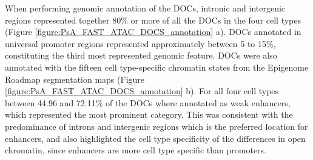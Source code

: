   
When performing genomic annotation of the DOCs, intronic and intergenic regions represented together 80\% or more of all the DOCs in the four cell types (Figure \ref{figure:PsA_FAST_ATAC_DOCS_annotation} a). DOCs annotated in universal promoter regions represented approximately between 5 to 15\%, constituting the third most represented genomic feature. DOCs were also annotated with the fifteen cell type-specific chromatin states from the Epigenome Roadmap segmentation maps (Figure \ref{figure:PsA_FAST_ATAC_DOCS_annotation} b). For all four cell types between 44.96 and 72.11\% of the DOCs where annotated as weak enhancers, which represented the most prominent category. This was consistent with the predominance of introns and intergenic regions which is the preferred location for enhancers, and also highlighted the cell type specificity of the differences in open chromatin, since enhancers are more cell type specific than promoters. %


